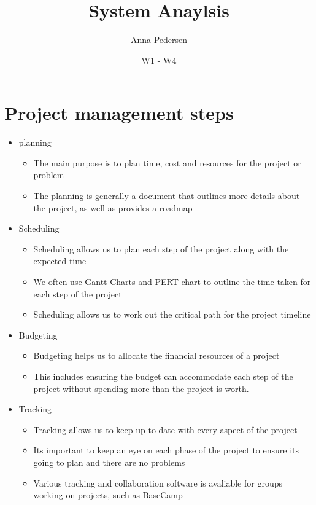 \documentclass[12pt, a4, twoside]{article}
\title{System Anaylsis}
\author{Anna Pedersen}
\date{W1 - W4}
\begin{document}
  \maketitle

  \section{Project management steps }
  \begin{itemize}
    \item planning
    \begin{itemize}
      \item The main purpose is to plan time, cost and resources for the project or problem
      \item The planning is generally a document that outlines more details about the project, as well as provides a roadmap
    \end{itemize}
    \item Scheduling 
    \begin{itemize}
      \item Scheduling allows us to plan each step of the project along with the expected time
      \item We often use Gantt Charts and PERT chart to outline the time taken for each step of the project
      \item Scheduling allows us to work out the critical path for the project timeline
    \end{itemize}
    \item Budgeting
    \begin{itemize}
      \item Budgeting helps us to allocate the financial resources of a project
      \item This includes ensuring the budget can accommodate each step of the project without spending more than the project is worth.
    \end{itemize}
    \item Tracking
    \begin{itemize}
      \item Tracking allows us to keep up to date with every aspect of the project
      \item Its important to keep an eye on each phase of the project to ensure its going to plan and there are no problems
      \item Various tracking and collaboration software is avaliable for groups working on projects, such as BaseCamp
    \end{itemize}
  \end{itemize}
\end{document}

